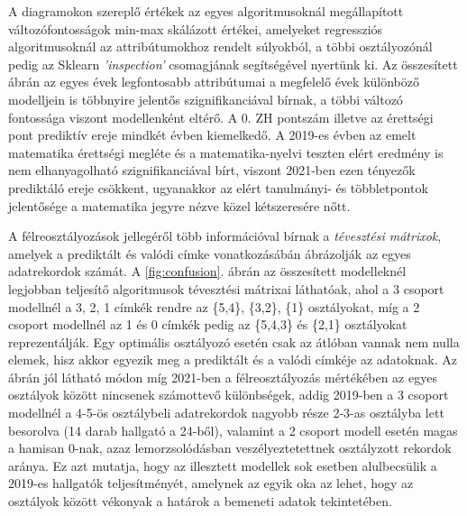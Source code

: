 \documentclass[12pt]{article}
\begin{document}
%	



\noindent A diagramokon szereplő értékek az egyes algoritmusoknál megállapított változófontosságok min-max skálázott értékei, amelyeket regressziós algoritmusoknál az attribútumokhoz rendelt súlyokból, a többi osztályozónál pedig az Sklearn \textit{'inspection'} csomagjának segítségével nyertünk ki. Az összesített ábrán az egyes évek legfontosabb attribútumai a megfelelő évek különböző modelljein is többnyire jelentős szignifikanciával bírnak, a többi változó fontossága viszont modellenként eltérő. A 0. ZH pontszám illetve az érettségi pont prediktív ereje mindkét évben kiemelkedő. A 2019-es évben az emelt matematika érettségi megléte és a matematika-nyelvi teszten elért eredmény is nem elhanyagolható szignifikanciával bírt, viszont 2021-ben ezen tényezők prediktáló ereje csökkent, ugyanakkor az elért tanulmányi- és többletpontok jelentősége a matematika jegyre nézve közel kétszeresére nőtt.

A félreosztályozások jellegéről több információval bírnak a \emph{tévesztési mátrixok}, amelyek a prediktált és valódi címke vonatkozásábán ábrázolják az egyes adatrekordok számát. A \ref{fig:confusion}. ábrán az összesített modelleknél legjobban teljesítő algoritmusok tévesztési mátrixai láthatóak, ahol a 3 csoport modellnél a 3, 2, 1 címkék rendre az \{5,4\}, \{3,2\}, \{1\} osztályokat, míg a 2 csoport modellnél az 1 és 0 címkék pedig az \{5,4,3\} és \{2,1\} osztályokat reprezentálják. Egy optimális osztályozó esetén csak az átlóban vannak nem nulla elemek, hisz akkor egyezik meg a prediktált és a valódi címkéje az adatoknak. Az ábrán jól látható módon míg 2021-ben a félreosztályozás mértékében az egyes osztályok között nincsenek számottevő különbségek, addig 2019-ben a 3 csoport modellnél a 4-5-ös osztálybeli adatrekordok nagyobb része 2-3-as osztályba lett besorolva (14 darab hallgató a 24-ből), valamint a 2 csoport modell esetén magas a hamisan 0-nak, azaz lemorzsolódásban veszélyeztetettnek osztályzott rekordok aránya. Ez azt mutatja, hogy az illesztett modellek sok esetben alulbecsülik a 2019-es hallgatók teljesítményét, amelynek az egyik oka az lehet, hogy az osztályok között vékonyak a határok a bemeneti adatok tekintetében.
\end{document}
